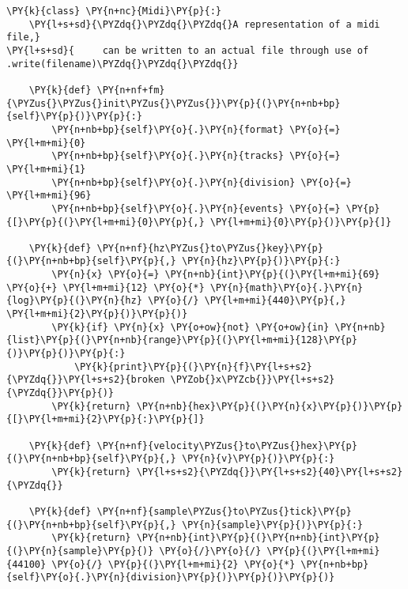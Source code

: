 \begin{Verbatim}[commandchars=\\\{\}]
\PY{k}{class} \PY{n+nc}{Midi}\PY{p}{:}
    \PY{l+s+sd}{\PYZdq{}\PYZdq{}\PYZdq{}A representation of a midi file,}
\PY{l+s+sd}{     can be written to an actual file through use of .write(filename)\PYZdq{}\PYZdq{}\PYZdq{}}

    \PY{k}{def} \PY{n+nf+fm}{\PYZus{}\PYZus{}init\PYZus{}\PYZus{}}\PY{p}{(}\PY{n+nb+bp}{self}\PY{p}{)}\PY{p}{:}
        \PY{n+nb+bp}{self}\PY{o}{.}\PY{n}{format} \PY{o}{=} \PY{l+m+mi}{0}
        \PY{n+nb+bp}{self}\PY{o}{.}\PY{n}{tracks} \PY{o}{=} \PY{l+m+mi}{1}
        \PY{n+nb+bp}{self}\PY{o}{.}\PY{n}{division} \PY{o}{=} \PY{l+m+mi}{96}
        \PY{n+nb+bp}{self}\PY{o}{.}\PY{n}{events} \PY{o}{=} \PY{p}{[}\PY{p}{(}\PY{l+m+mi}{0}\PY{p}{,} \PY{l+m+mi}{0}\PY{p}{)}\PY{p}{]}

    \PY{k}{def} \PY{n+nf}{hz\PYZus{}to\PYZus{}key}\PY{p}{(}\PY{n+nb+bp}{self}\PY{p}{,} \PY{n}{hz}\PY{p}{)}\PY{p}{:}
        \PY{n}{x} \PY{o}{=} \PY{n+nb}{int}\PY{p}{(}\PY{l+m+mi}{69} \PY{o}{+} \PY{l+m+mi}{12} \PY{o}{*} \PY{n}{math}\PY{o}{.}\PY{n}{log}\PY{p}{(}\PY{n}{hz} \PY{o}{/} \PY{l+m+mi}{440}\PY{p}{,} \PY{l+m+mi}{2}\PY{p}{)}\PY{p}{)}
        \PY{k}{if} \PY{n}{x} \PY{o+ow}{not} \PY{o+ow}{in} \PY{n+nb}{list}\PY{p}{(}\PY{n+nb}{range}\PY{p}{(}\PY{l+m+mi}{128}\PY{p}{)}\PY{p}{)}\PY{p}{:}
            \PY{k}{print}\PY{p}{(}\PY{n}{f}\PY{l+s+s2}{\PYZdq{}}\PY{l+s+s2}{broken \PYZob{}x\PYZcb{}}\PY{l+s+s2}{\PYZdq{}}\PY{p}{)}
        \PY{k}{return} \PY{n+nb}{hex}\PY{p}{(}\PY{n}{x}\PY{p}{)}\PY{p}{[}\PY{l+m+mi}{2}\PY{p}{:}\PY{p}{]}

    \PY{k}{def} \PY{n+nf}{velocity\PYZus{}to\PYZus{}hex}\PY{p}{(}\PY{n+nb+bp}{self}\PY{p}{,} \PY{n}{v}\PY{p}{)}\PY{p}{:}
        \PY{k}{return} \PY{l+s+s2}{\PYZdq{}}\PY{l+s+s2}{40}\PY{l+s+s2}{\PYZdq{}}

    \PY{k}{def} \PY{n+nf}{sample\PYZus{}to\PYZus{}tick}\PY{p}{(}\PY{n+nb+bp}{self}\PY{p}{,} \PY{n}{sample}\PY{p}{)}\PY{p}{:}
        \PY{k}{return} \PY{n+nb}{int}\PY{p}{(}\PY{n+nb}{int}\PY{p}{(}\PY{n}{sample}\PY{p}{)} \PY{o}{/}\PY{o}{/} \PY{p}{(}\PY{l+m+mi}{44100} \PY{o}{/} \PY{p}{(}\PY{l+m+mi}{2} \PY{o}{*} \PY{n+nb+bp}{self}\PY{o}{.}\PY{n}{division}\PY{p}{)}\PY{p}{)}\PY{p}{)}


\end{Verbatim}
